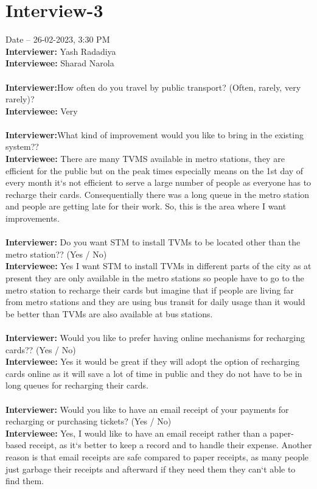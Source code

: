 \documentclass[a4paper,12pt]{report}
\begin{document}
\section{Interview-3}
Date – 26-02-2023, 3:30 PM\\
\textbf{Interviewer:} Yash Radadiya\\
\textbf{Interviewee:} Sharad Narola \\\\
\textbf{Interviewer:}How often do you travel by public transport? (Often, rarely, very rarely)?\\
\textbf{Interviewee:} Very\\\\
\textbf{Interviewer:}What kind of improvement would you like to bring in the existing system??\\
\textbf{Interviewee:} There are many TVMS available in metro stations, they are efficient for the public but on the peak times especially means on the 1st day of every month it`s not efficient to serve a large number of people as everyone has to recharge their cards. Consequentially there was a long queue in the metro station and people are getting late for their work. So, this is the area where I want improvements.\\\\
\textbf{Interviewer:}  Do you want STM to install TVMs to be located other than the metro station?? (Yes / No)\\
\textbf{Interviewee:} Yes I want STM to install TVMs in different parts of the city as at present they are only available in the metro stations so people have to go to the metro station to recharge their cards but imagine that if people are living far from metro stations and they are using bus transit for daily usage than it would be better than TVMs are also available at bus stations.\\\\
\textbf{Interviewer:}  Would you like to prefer having online mechanisms for recharging cards?? (Yes / No)\\
\textbf{Interviewee:} Yes it would be great if they will adopt the option of recharging cards online as it will save a lot of time in public and they do not have to be in long queues for recharging their cards.\\\\
\textbf{Interviewer:} Would you like to have an email receipt of your payments for recharging or purchasing tickets? (Yes / No)\\
\textbf{Interviewee:} Yes, I would like to have an email receipt rather than a paper-based receipt, as it`s better to keep a record and to handle their expense. Another reason is that email receipts are safe compared to paper receipts, as many people just garbage their receipts and afterward if they need them they can`t able to find them.\\\\
\end{document}
